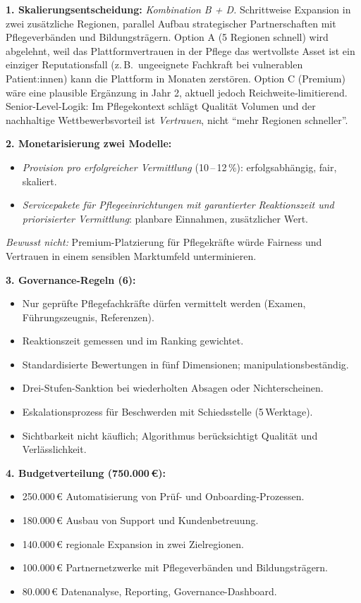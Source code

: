 \documentclass[11pt,a4paper,oneside]{article}
\begin{document}
\begin{loesungbox}
\textbf{1. Skalierungsentscheidung:}
\emph{Kombination B + D.} Schrittweise Expansion in zwei zusätzliche Regionen, parallel Aufbau strategischer Partnerschaften mit Pflegeverbänden und Bildungsträgern. Option A (5 Regionen schnell) wird abgelehnt, weil das Plattformvertrauen in der Pflege das wertvollste Asset ist \textendash{} ein einziger Reputationsfall (z.\,B.\ ungeeignete Fachkraft bei vulnerablen Patient:innen) kann die Plattform in Monaten zerstören. Option C (Premium) wäre eine plausible Ergänzung in Jahr 2, aktuell jedoch Reichweite-limitierend. Senior-Level-Logik: Im Pflegekontext schlägt Qualität Volumen \textendash{} und der nachhaltige Wettbewerbsvorteil ist \emph{Vertrauen}, nicht ``mehr Regionen schneller''.

\textbf{2. Monetarisierung \textendash{} zwei Modelle:}
\begin{itemize}
  \item \emph{Provision pro erfolgreicher Vermittlung} (10\,--\,12\,\%): erfolgsabhängig, fair, skaliert.
  \item \emph{Servicepakete für Pflegeeinrichtungen mit garantierter Reaktionszeit und priorisierter Vermittlung}: planbare Einnahmen, zusätzlicher Wert.
\end{itemize}
\emph{Bewusst nicht:} Premium-Platzierung für Pflegekräfte \textendash{} würde Fairness und Vertrauen in einem sensiblen Marktumfeld unterminieren.

\textbf{3. Governance-Regeln (6):}
\begin{itemize}
  \item Nur geprüfte Pflegefachkräfte dürfen vermittelt werden (Examen, Führungszeugnis, Referenzen).
  \item Reaktionszeit gemessen und im Ranking gewichtet.
  \item Standardisierte Bewertungen in fünf Dimensionen; manipulationsbeständig.
  \item Drei-Stufen-Sanktion bei wiederholten Absagen oder Nichterscheinen.
  \item Eskalationsprozess für Beschwerden mit Schiedsstelle (5\,Werktage).
  \item Sichtbarkeit nicht käuflich; Algorithmus berücksichtigt Qualität und Verlässlichkeit.
\end{itemize}

\textbf{4. Budgetverteilung (750.000\,\euro):}
\begin{itemize}
  \item 250.000\,\euro{} \textendash{} Automatisierung von Prüf- und Onboarding-Prozessen.
  \item 180.000\,\euro{} \textendash{} Ausbau von Support und Kundenbetreuung.
  \item 140.000\,\euro{} \textendash{} regionale Expansion in zwei Zielregionen.
  \item 100.000\,\euro{} \textendash{} Partnernetzwerke mit Pflegeverbänden und Bildungsträgern.
  \item 80.000\,\euro{} \textendash{} Datenanalyse, Reporting, Governance-Dashboard.
\end{itemize}


\end{loesungbox}
\end{document}
